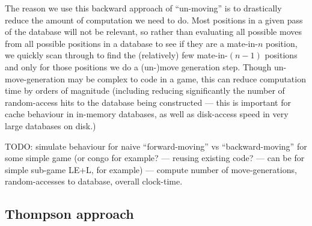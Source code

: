\documentclass[10pt,dvipdfmx,letterpaper]{report}
\begin{document}
The reason we use this backward approach of ``un-moving'' is to drastically reduce the amount
of computation we need to do.  Most positions in a given pass of the database will not be relevant,
so rather than evaluating all possible moves from all possible positions in a database to see
if they are a mate-in-$n$ position, we quickly scan through to find the (relatively) few
mate-in-$(n-1)$ positions and only for those positions we do a (un-)move generation step.
Though un-move-generation may be complex to code in a game, this can reduce computation time by
orders of magnitude (including reducing significantly the number of random-access hits to the
database being constructed --- this is important for cache behaviour in in-memory databases, as well
as disk-access speed in very large databases on disk.)

TODO:
simulate behaviour for naive ``forward-moving'' vs ``backward-moving'' for some simple game
(or congo for example? --- reusing existing code? --- can be for simple sub-game
LE+L, for example)
--- compute number of move-generations, random-accesses to database, overall clock-time.

\subsection{Thompson approach}
\end{document}
